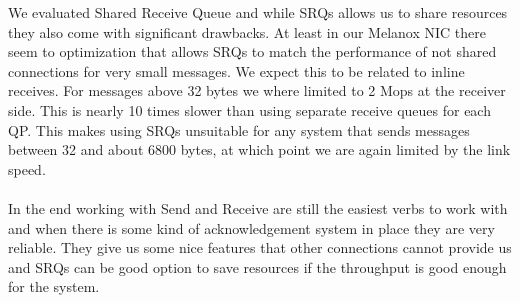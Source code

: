 We evaluated Shared Receive Queue and while SRQs allows us to share resources they also come with significant drawbacks. At
least in our Melanox NIC there seem to optimization that allows SRQs to match the performance of not shared connections for
very small messages. We expect this to be related to inline receives. For messages above 32 bytes we where limited to 
2 Mops at the receiver side. This is nearly 10 times slower than using separate receive queues for each QP. This makes 
using SRQs unsuitable for any system that sends messages between 32 and about 6800 bytes, at which point we are again limited 
by the link speed.


\paragraph{} In the end working with Send and Receive are still the easiest verbs to work with and when there is some kind of
acknowledgement system in place they are very reliable. They give us some nice features that other connections cannot provide
us and SRQs can be good option to save resources if the throughput is good enough for the system.

